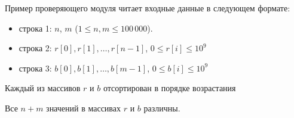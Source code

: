 Пример проверяющего модуля читает входные данные в следующем формате:
\begin{itemize}
\item строка 1: $n$, $m$ ($1 \le n, m \le 100\,000$).
\item строка 2: $r[0], r[1], \ldots, r[n - 1]$, $0 \le r[i] \le 10^9$
\item строка 3: $b[0], b[1], \ldots, b[m - 1]$, $0 \le b[i] \le 10^9$
\end{itemize}

Каждый из массивов $r$ и $b$ отсортирован в порядке возрастания

Все $n + m$ значений в массивах $r$ и $b$ различны.